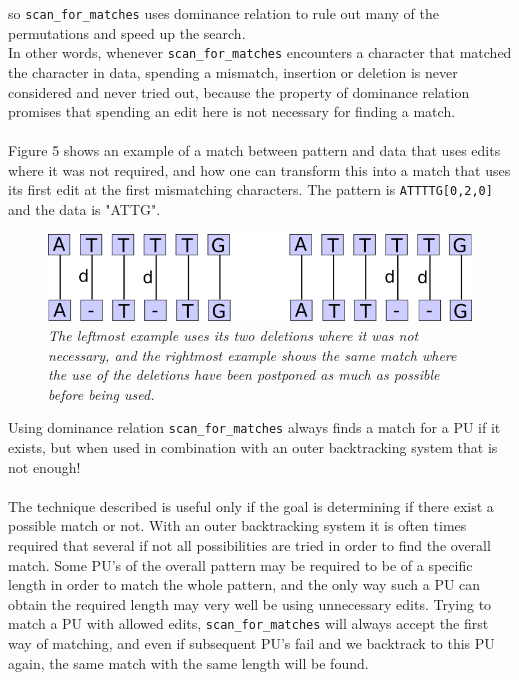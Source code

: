 \documentclass[12pt]{article}
\newcommand{\scm}{\texttt{scan\_for\_matches} }
\newcommand{\pu}{PU }
\newcommand{\pus}{PU's }
\begin{document}
so \scm uses dominance relation to rule out many of the permutations and speed up the search. \\
In other words, whenever \scm
encounters a character that matched the character in data, spending a mismatch, insertion or deletion is never
considered and never tried out, because the property of dominance relation promises that spending an edit
here is not necessary for finding a match. \\ \\
Figure 5 shows an example of a match between pattern and data that uses edits where it was not required,
and how one can transform this into a match that uses its first edit at the first mismatching characters.
The pattern is \texttt{ATTTTG[0,2,0]} and the data is "ATTG".
\begin{figure}
\begin{center}
\includegraphics[scale=0.6]{Diagrams/shunt.png}
\end{center}
\caption{\textit{The leftmost example uses its two deletions where it was not necessary, and the rightmost example shows
the same match where the use of the deletions have been postponed as much as possible before being used.}}
\end{figure}
\noindent Using dominance relation \scm always finds a match for a \pu if it exists, but when used in combination
with an outer backtracking system that is not enough! \\ \\
The technique described is useful only if the goal is determining if there exist a possible match or not.
With an outer backtracking system it is often times required that several if not all possibilities are tried in
order to find the overall match. Some \pus of the overall pattern may be required to be of a specific length in order to
match the whole pattern, and the only way such a \pu can obtain the required length may very well be using unnecessary
edits. Trying to match a \pu with allowed edits, \scm will always accept the first way of matching, and even if
subsequent \pus fail and we backtrack to this \pu again, the same match with the same length will be found. \\ \\
\end{document}
